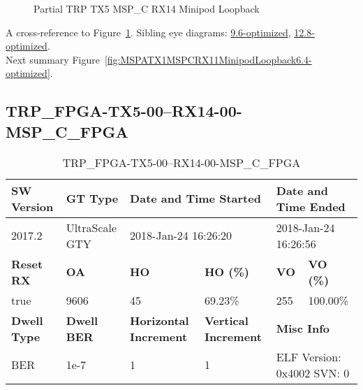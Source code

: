 \begin{figure}[h]
\begin{subfigure}{0.5\textwidth}
\hyperref[sec:TRPFPGATX506RX1406MSPCFPGA6.4-optimized]{}
\end{subfigure}\hspace*{\fill}
\begin{subfigure}{0.5\textwidth}
\hyperref[sec:TRPFPGATX507RX1407MSPCFPGA6.4-optimized]{}
\end{subfigure}

\caption{Partial TRP TX5 MSP\_C RX14 Minipod Loopback} \label{fig:PartialTRPTX5MSPCRX14MinipodLoopback6.4-optimized}
\end{figure}

A cross-reference to Figure~\ref{fig:PartialTRPTX5MSPCRX14MinipodLoopback6.4-optimized}.
Sibling eye diagrams: \hyperref[sec:PartialTRPTX5MSPCRX14MinipodLoopback9.6-optimized]{9.6-optimized}, \hyperref[sec:PartialTRPTX5MSPCRX14MinipodLoopback12.8-optimized]{12.8-optimized}. \\
Next summary Figure~\ref{fig:MSPATX1MSPCRX11MinipodLoopback6.4-optimized}.
\clearpage
% 
\subsection{TRP\_FPGA-TX5-00--RX14-00-MSP\_C\_FPGA}\label{sec:TRPFPGATX500RX1400MSPCFPGA6.4-optimized}

\begin{table}[h]
\centering
\caption{TRP\_FPGA-TX5-00--RX14-00-MSP\_C\_FPGA}
\label{tab:TRPFPGATX500RX1400MSPCFPGA6.4-optimized}
\begin{tabular}{@{}|l|l|l|l|l|l|@{}}
\toprule
\textbf{SW Version}                & \textbf{GT Type}   & \multicolumn{2}{l|}{\textbf{Date and Time Started}}            & \multicolumn{2}{l|}{\textbf{Date and Time Ended}}        \\ \midrule
2017.2                       & UltraScale GTY          & \multicolumn{2}{l|}{2018-Jan-24 16:26:20}                   & \multicolumn{2}{l|}{2018-Jan-24 16:26:56}               \\ \midrule
\textbf{Reset RX}                  & \textbf{OA} & \textbf{HO}   & \textbf{HO (\%)} & \textbf{VO} & \textbf{VO (\%)} \\ \midrule
true & 9606        & 45          & 69.23\%        & 255        & 100.00\%       \\ \midrule
\textbf{Dwell Type}                & \textbf{Dwell BER} & \textbf{Horizontal Increment} & \textbf{Vertical Increment}    & \multicolumn{2}{l|}{\textbf{Misc Info}}                  \\ \midrule
BER                            & 1e-7        & 1        & 1           & \multicolumn{2}{l|}{ELF Version: 0x4002 SVN: 0}                         \\ \bottomrule
\end{tabular}
\end{table}

